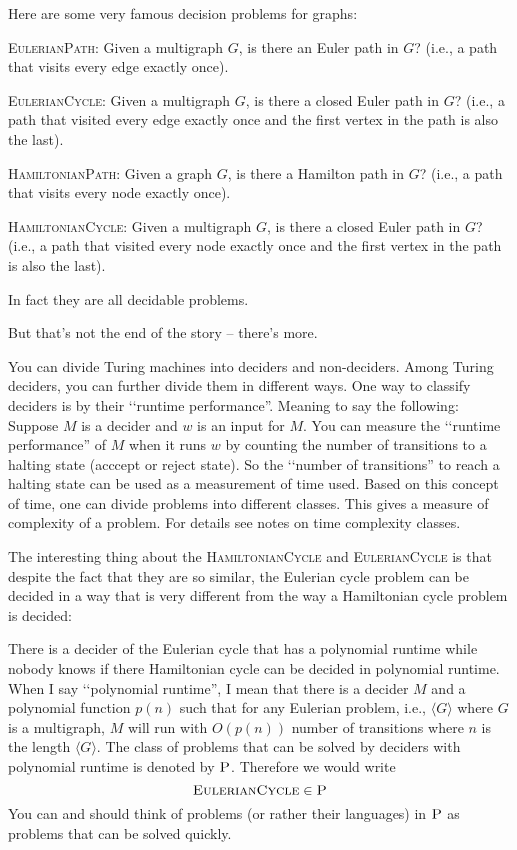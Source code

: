 Here are some very famous decision problems for graphs:
\begin{tightlist}
  \item \textsc{EulerianPath}: Given a multigraph $G$, is there an Euler path in $G$?
  (i.e., a path that visits every edge exactly once).
  \item \textsc{EulerianCycle}: Given a multigraph $G$, is there a closed Euler path in $G$?
  (i.e., a path that visited every edge exactly once and the first vertex in the path
  is also the last).
  \item \textsc{HamiltonianPath}: Given a graph $G$, is there a
  Hamilton path in $G$?
  (i.e., a path that visits every node exactly once).
  \item \textsc{HamiltonianCycle}: Given a multigraph $G$, is there a closed Euler path in $G$?
  (i.e., a path that visited every node exactly once and the first vertex in the path
  is also the last).
\end{tightlist}
In fact they are all decidable problems.



But that's not the end of the story -- there's more.

You can divide Turing machines into deciders and non-deciders.
Among Turing deciders, you can further divide them in different ways.
One way to classify deciders is by their \lq\lq runtime performance''.
Meaning to say the following:
Suppose $M$ is a decider and $w$ is an input for $M$.
You can measure the \lq\lq runtime performance'' of $M$ when it runs $w$ by
counting the number of transitions to a halting state (acccept or reject state).
So the \lq\lq number of transitions'' to reach a halting state can be used as a
measurement of time used.
Based on this concept of time, one can divide problems into different
classes.
This gives a measure of complexity of a problem.
For details see notes on time complexity classes.

The interesting thing about the
\textsc{HamiltonianCycle}
and
\textsc{EulerianCycle}
is that despite the fact that they are so similar,
the Eulerian cycle problem can be decided in a way that
is very different from the way a Hamiltonian cycle problem is decided:

There is a decider of the Eulerian cycle that has a polynomial
runtime while nobody knows if there Hamiltonian cycle can be
decided in polynomial runtime.
When I say \lq\lq polynomial runtime'', I mean
that there is a decider $M$ and a polynomial function $p(n)$
such that for any Eulerian problem, i.e., $\langle G \rangle$ where $G$ is a multigraph,
$M$ will run with $O(p(n))$ number of transitions
where $n$ is the length $\langle G \rangle$.
The class of problems that can be solved by deciders with polynomial runtime
is denoted by $\textsc{P}$.
Therefore we would write
\[
\textsc{EulerianCycle} \in \textsc{P}
\]
You can and should think of problems
(or rather their languages) in $\textsc{P}$ as
problems that can be solved
quickly.


